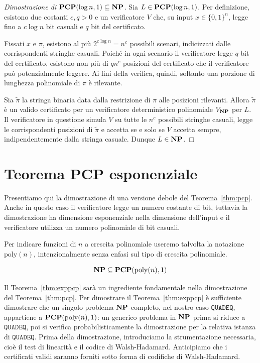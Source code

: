 \begin{proof}[Dimostrazione di $\mathbf{PCP}(\log n, 1) \subseteq \mathbf{NP}$]
	Sia $L \in \mathbf{PCP}(\log n, 1)$. Per definizione, esistono due costanti $c, q > 0$
	e un verificatore $V$ che, su input $x \in \{0,1\}^n$, legge fino a
	$c \log n$ bit casuali e $q$ bit del certificato.

	Fissati $x$ e $\pi$, esistono al più $2^{c \log n} = n^c$ possibili scenari,
	indicizzati dalle corrispondenti stringhe casuali. Poiché in ogni
	scenario il verificatore legge $q$ bit del certificato, esistono non più di
	$q n^c$ posizioni del certificato che il verificatore può potenzialmente
	leggere. Ai fini della verifica, quindi, soltanto una porzione di lunghezza
	polinomiale di $\pi$ è rilevante.

	Sia $\tilde{\pi}$ la stringa binaria data dalla restrizione di $\pi$ alle
	posizioni rilevanti. Allora $\tilde{\pi}$ è un valido certificato per un
	verificatore deterministico polinomiale $V_{\mathbf{NP}}$ per $L$. Il verificatore in
	questione simula $V$ su tutte le $n^c$ possibili stringhe casuali, legge le
	corrispondenti posizioni di $\tilde{\pi}$ e accetta se e solo se $V$ accetta
	sempre, indipendentemente dalla stringa casuale. Dunque $L \in \mathbf{NP}$.
\end{proof}


\section{Teorema PCP esponenziale}

Presentiamo qui la dimostrazione di una versione debole del
Teorema~\ref{thm:pcp}. Anche in questo caso il verificatore legge un numero
costante di bit, tuttavia la dimostrazione ha dimensione esponenziale nella
dimensione dell'input e il verificatore utilizza un numero polinomiale di bit
casuali.

Per indicare funzioni di $n$ a crescita polinomiale useremo talvolta la
notazione $\mathrm{poly}(n)$, intenzionalmente senza enfasi sul tipo di crescita
polinomiale.

\begin{theorem} \label{thm:exppcp}
	\[
		\mathbf{NP} \subseteq \mathbf{PCP}(\mathrm{poly}(n), 1)
	\]
\end{theorem}

Il Teorema~\ref{thm:exppcp} sarà un ingrediente fondamentale nella dimostrazione
del Teorema~\ref{thm:pcp}. Per dimostrare il Teorema~\ref{thm:exppcp} è
sufficiente dimostrare che un singolo problema $\mathbf{NP}$-completo, nel nostro caso
$\mathtt{QUADEQ}$, appartiene a $\mathbf{PCP}(\mathrm{poly}(n), 1)$: un generico
problema in $\mathbf{NP}$ prima si riduce a $\mathtt{QUADEQ}$, poi si verifica
probabilisticamente la dimostrazione per la relativa istanza di
$\mathtt{QUADEQ}$.
Prima della dimostrazione, introduciamo la strumentazione necessaria, cioè il
test di linearità e il codice di Walsh-Hadamard. Anticipiamo che i certificati
validi saranno forniti sotto forma di codifiche di Walsh-Hadamard.

